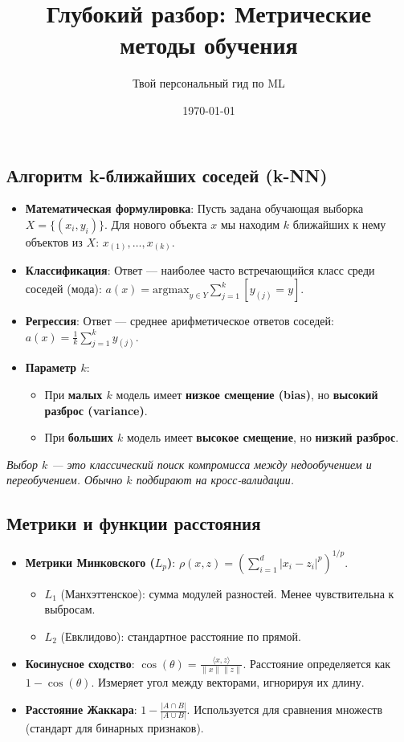 \documentclass[12pt]{article}
\title{Глубокий разбор: Метрические методы обучения}
\author{Твой персональный гид по ML}
\date{\today}
\newcommand{\commentary}[1]{{\small\itshape\color{commentgray} #1}}
\begin{document}
\subsection{Алгоритм k-ближайших соседей (k-NN)}

\begin{itemize}
    \item \textbf{Математическая формулировка}: Пусть задана обучающая выборка $X = \{(x_i, y_i)\}$. Для нового объекта $x$ мы находим $k$ ближайших к нему объектов из $X$: $x_{(1)}, \dots, x_{(k)}$.
    \item \textbf{Классификация}: Ответ — наиболее часто встречающийся класс среди соседей (мода): $a(x) = \text{argmax}_{y \in Y} \sum_{j=1}^k [y_{(j)} = y]$.
    \item \textbf{Регрессия}: Ответ — среднее арифметическое ответов соседей: $a(x) = \frac{1}{k} \sum_{j=1}^k y_{(j)}$.
    \item \textbf{Параметр $k$}: 
    \begin{itemize}
        \item При \textbf{малых $k$} модель имеет \textbf{низкое смещение (bias)}, но \textbf{высокий разброс (variance)}.
        \item При \textbf{больших $k$} модель имеет \textbf{высокое смещение}, но \textbf{низкий разброс}.
    \end{itemize}
\end{itemize}

\commentary{Выбор $k$ — это классический поиск компромисса между недообучением и переобучением. Обычно $k$ подбирают на кросс-валидации.}

\subsection{Метрики и функции расстояния}

\begin{itemize}
    \item \textbf{Метрики Минковского ($L_p$)}: $\rho(x, z) = \left( \sum_{i=1}^d |x_i - z_i|^p \right)^{1/p}$. 
    \begin{itemize}
        \item $L_1$ (Манхэттенское): сумма модулей разностей. Менее чувствительна к выбросам.
        \item $L_2$ (Евклидово): стандартное расстояние по прямой.
    \end{itemize}
    \item \textbf{Косинусное сходство}: $\cos(\theta) = \frac{\langle x, z \rangle}{\|x\| \|z\|}$. Расстояние определяется как $1 - \cos(\theta)$. Измеряет угол между векторами, игнорируя их длину.
    \item \textbf{Расстояние Жаккара}: $1 - \frac{|A \cap B|}{|A \cup B|}$. Используется для сравнения множеств (стандарт для бинарных признаков).
\end{itemize}
\end{document}
